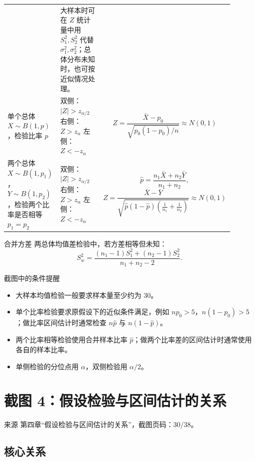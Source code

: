 \documentclass[UTF8,zihao=-4,fontset=fandol]{ctexart}
\begin{document}
\begin{longtable}{p{0.24\linewidth}p{0.32\linewidth}p{0.34\linewidth}}
&
大样本时可在 $Z$ 统计量中用 $S_1^2,S_2^2$ 代替 $\sigma_1^2,\sigma_2^2$；总体分布未知时，也可按近似情况处理。
\\
\addlinespace
单个总体 $X\sim B(1,p)$，检验比率 $p$
&
双侧：$|Z|>z_{\alpha/2}$\newline
右侧：$Z>z_{\alpha}$\newline
左侧：$Z<-z_{\alpha}$
&
\[
Z=
\frac{\bar{X}-p_0}
{\sqrt{p_0(1-p_0)/n}}
\approx N(0,1)
\]
\\
\addlinespace
两个总体 $X\sim B(1,p_1)$，$Y\sim B(1,p_2)$，检验两个比率是否相等 $p_1=p_2$
&
双侧：$|Z|>z_{\alpha/2}$\newline
右侧：$Z>z_{\alpha}$\newline
左侧：$Z<-z_{\alpha}$
&
\[
\hat{p}=\frac{n_1\bar{X}+n_2\bar{Y}}{n_1+n_2},
\]
\[
Z=
\frac{\bar{X}-\bar{Y}}
{\sqrt{\hat{p}(1-\hat{p})\left(\frac{1}{n_1}+\frac{1}{n_2}\right)}}
\approx N(0,1)
\]
\\
\bottomrule
\end{longtable}

\begin{keybox}{合并方差}
两总体均值差检验中，若方差相等但未知：
\[
S_w^2=
\frac{(n_1-1)S_1^2+(n_2-1)S_2^2}{n_1+n_2-2}.
\]
\end{keybox}

\begin{warnbox}{截图中的条件提醒}
\begin{itemize}
  \item 大样本均值检验一般要求样本量至少约为 $30$。
  \item 单个比率检验要求原假设下的近似条件满足，例如 $np_0>5$，$n(1-p_0)>5$；做比率区间估计时通常检查 $n\hat p$ 与 $n(1-\hat p)$。
  \item 两个比率相等检验使用合并样本比率 $\hat p$；做两个比率差的区间估计时通常使用各自的样本比率。
  \item 单侧检验的分位点用 $\alpha$，双侧检验用 $\alpha/2$。
\end{itemize}
\end{warnbox}

\section{截图 4：假设检验与区间估计的关系}

\begin{sourcebox}{来源}
第四章“假设检验与区间估计的关系”，截图页码：30/38。
\end{sourcebox}

\subsection{核心关系}
\end{document}
